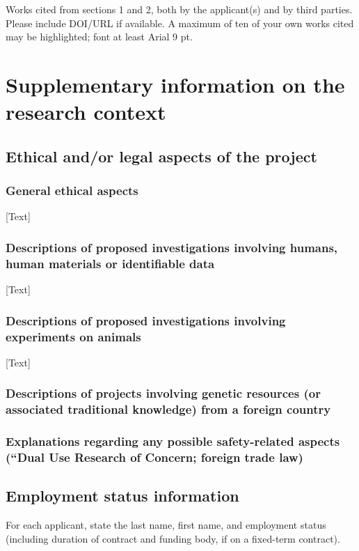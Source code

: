 \documentclass[11pt,a4paper]{article}
\begin{document}
Works cited from sections 1 and 2, both by the applicant(s) and by third parties. Please include DOI/URL if available. A maximum of ten of your own works cited may be highlighted; font at least Arial 9 pt.


\section{Supplementary information on the research context}

\subsection{Ethical and/or legal aspects of the project}

\subsubsection{General ethical aspects}

[Text]

\subsubsection{Descriptions of proposed investigations involving humans, human materials or identifiable data}

[Text]

\subsubsection{Descriptions of proposed investigations involving experiments on animals}

[Text]

\subsubsection{Descriptions of projects involving genetic resources (or associated traditional knowledge) from a foreign country}

\subsubsection{Explanations regarding any possible safety-related aspects (“Dual Use Research of Concern; foreign trade law)}

\subsection{Employment status information}
For each applicant, state the last name, first name, and employment status (including duration of contract and funding body, if on a fixed-term contract).
\end{document}
